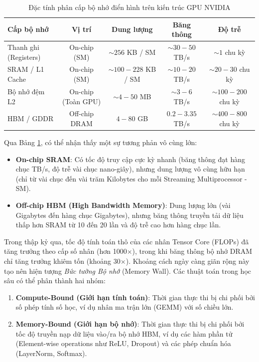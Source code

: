 \documentclass[10pt,a4paper]{article}
\begin{document}
\begin{table}[htbp]
\centering
\small
\caption{Đặc tính phân cấp bộ nhớ điển hình trên kiến trúc GPU NVIDIA}
\label{tab:gpu_memory_hierarchy}
\setlength{\tabcolsep}{7pt}
\begin{tabular}{lcccc}
\toprule
\textbf{Cấp bộ nhớ} & \textbf{Vị trí} & \textbf{Dung lượng} & \textbf{Băng thông} & \textbf{Độ trễ} \\
\midrule
Thanh ghi (Registers) & On-chip (SM) & $\sim 256$ KB / SM & $\sim 30 - 50$ TB/s & $\sim 1$ chu kỳ \\
SRAM / L1 Cache & On-chip (SM) & $\sim 100 - 228$ KB / SM & $\sim 10 - 20$ TB/s & $\sim 20 - 30$ chu kỳ \\
Bộ nhớ đệm L2 & On-chip (Toàn GPU) & $\sim 4 - 50$ MB & $\sim 3 - 6$ TB/s & $\sim 100 - 200$ chu kỳ \\
HBM / GDDR & Off-chip DRAM & $4 - 80$ GB & $0.2 - 3.35$ TB/s & $\sim 400 - 800$ chu kỳ \\
\bottomrule
\end{tabular}
\end{table}

Qua Bảng \ref{tab:gpu_memory_hierarchy}, có thể nhận thấy một sự tương phản vô cùng lớn:
\begin{itemize}[leftmargin=*]
    \item \textbf{On-chip SRAM}: Có tốc độ truy cập cực kỳ nhanh (băng thông đạt hàng chục TB/s, độ trễ vài chục nano-giây), nhưng dung lượng vô cùng hữu hạn (chỉ từ vài chục đến vài trăm Kilobytes cho mỗi Streaming Multiprocessor - SM).
    \item \textbf{Off-chip HBM (High Bandwidth Memory)}: Dung lượng lớn (vài Gigabytes đến hàng chục Gigabytes), nhưng băng thông truyền tải dữ liệu thấp hơn SRAM từ 10 đến 20 lần và độ trễ cao hơn hàng chục lần.
\end{itemize}

Trong thập kỷ qua, tốc độ tính toán thô của các nhân Tensor Core (FLOPs) đã tăng trưởng theo cấp số nhân (hơn 1000$\times$), trong khi băng thông bộ nhớ DRAM chỉ tăng trưởng khiêm tốn (khoảng 30$\times$). Khoảng cách ngày càng giãn rộng này tạo nên hiện tượng \textit{Bức tường Bộ nhớ} (Memory Wall). Các thuật toán trong học sâu có thể phân thành hai nhóm:
\begin{enumerate}
    \item \textbf{Compute-Bound (Giới hạn tính toán)}: Thời gian thực thi bị chi phối bởi số phép tính số học, ví dụ nhân ma trận lớn (GEMM) với số chiều lớn.
    \item \textbf{Memory-Bound (Giới hạn bộ nhớ)}: Thời gian thực thi bị chi phối bởi tốc độ truyền nạp dữ liệu vào/ra bộ nhớ HBM, ví dụ các hàm phần tử (Element-wise operations như ReLU, Dropout) và các phép chuẩn hóa (LayerNorm, Softmax).
\end{enumerate}
\end{document}
